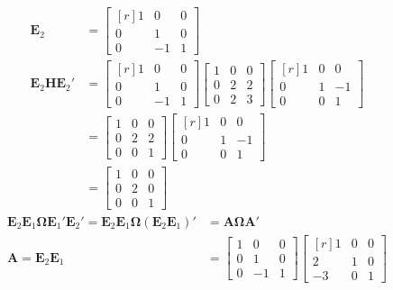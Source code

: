 \begin{enumerate}
\begin{align*}
	\mathbf{E}_2&=\begin{bmatrix*}[r]
	1&0&0\\
	0&1&0\\
	0&-1&1
	\end{bmatrix*}\\
	\mathbf{E}_2\mathbf{H}\mathbf{E}_2{'}&=\begin{bmatrix*}[r]
	1&0&0\\
	0&1&0\\
	0&-1&1
	\end{bmatrix*}
	\begin{bmatrix}
	1&0&0\\
	0&2&2\\
	0&2&3
	\end{bmatrix}
	\begin{bmatrix*}[r]
	1&0&0\\
	0&1&-1\\
	0&0&1
	\end{bmatrix*}\\
	&=\begin{bmatrix}
	1&0&0\\
	0&2&2\\
	0&0&1
	\end{bmatrix}
		\begin{bmatrix*}[r]
	1&0&0\\
	0&1&-1\\
	0&0&1
	\end{bmatrix*}\\
	&=\begin{bmatrix}
	1&0&0\\
	0&2&0\\
	0&0&1
	\end{bmatrix}
\end{align*}
\begin{align*}
\mathbf{E}_2\mathbf{E}_1\boldsymbol{\Omega}\mathbf{E}_1{'}\mathbf{E}_2{'}=\mathbf{E}_2\mathbf{E}_1\boldsymbol{\Omega}(\mathbf{E}_2\mathbf{E}_1)'&=\mathbf{A}\boldsymbol{\Omega}\mathbf{A}'\\
\mathbf{A}=\mathbf{E}_2\mathbf{E}_1&=
\begin{bmatrix}
1&0&0\\
0&1&0\\
0&-1&1
\end{bmatrix}
\begin{bmatrix*}[r]
1&0&0\\
2&1&0\\
-3&0&1
\end{bmatrix*}\\

\end{align*}
\end{enumerate}
